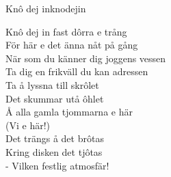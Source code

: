 \begin{song}{Knô dej in}{knodejin}
\begin{vers}
Knô dej in fast dôrra e trång\\
För här e det änna nåt på gång\\
När som du känner dig joggens vessen\\
Ta dig en frikväll du kan adressen\\
Ta å lyssna till skrôlet\\
Det skummar utå ôhlet\\
Å alla gamla tjommarna e här\\
(Vi e här!)\\
Det trängs å det brôtas\\
Kring disken det tjôtas\\
- Vilken festlig atmosfär!\\
\end{vers}
\end{song}
